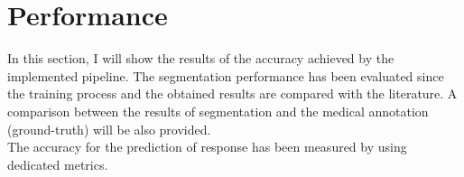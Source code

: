 \documentclass{standalone}
\begin{document}
\section{Performance}
In this section, I will show the results of the accuracy achieved by the implemented pipeline.
The segmentation performance has been evaluated since the training process and the obtained results are compared with the literature.
A comparison between the results of segmentation and the medical annotation (ground-truth) will be also provided.
\\
The accuracy for the prediction of response has been measured by using dedicated metrics.
\end{document}
